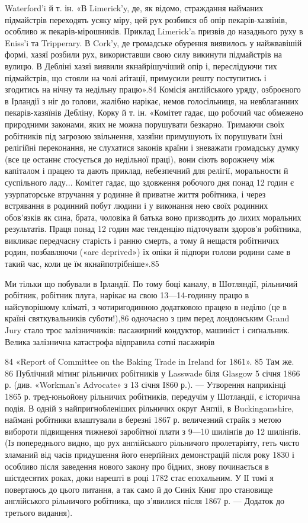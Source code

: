 Waterford’i й т. ін. «В Limerick’y, де, як відомо, страждання
найманих підмайстрів переходять усяку міру, цей рух розбився
об опір пекарів-хазяїнів, особливо ж пекарів-мірошників. Приклад
Limerick’a призвів до назаднього руху в Eniss’i та Tripperary.
В Cork’y, де громадське обурення виявилось у найжвавішій
формі, хазяї розбили рух, використавши свою силу викинути підмайстрів
на вулицю. В Дебліні хазяї виявили якнайрішучіший
опір і, переслідуючи тих підмайстрів, що стояли на чолі аґітації,
примусили решту поступитись і згодитись на нічну та недільну
працю».84 Комісія англійського уряду, озброєного в Ірландії
з ніг до голови, жалібно нарікає, немов голосільниця, на невблаганних
пекарів-хазяїнів Дебліну, Корку й т. ін. «Комітет гадає,
що робочий час обмежено природними законами, яких не можна
порушувати безкарно. Тримаючи своїх робітників під загрозою
звільнення, хазяїни примушують їх порушувати їхні релігійні
переконання, не слухатися законів країни і зневажати громадську
думку (все це останнє стосується до недільної праці), вони сіють
ворожнечу між капіталом і працею та дають приклад, небезпечний
для релігії, моральности й суспільного ладу... Комітет гадає,
що здовження робочого дня понад 12 годин є узурпаторське втручання
у родинне й приватне життя робітника, і через встрявання
в родинний побут людини і у виконання нею своїх родинних обов’язків
як сина, брата, чоловіка й батька воно призводить до лихих
моральних результатів. Праця понад 12 годин має тенденцію підточувати
здоров’я робітника, викликає передчасну старість і
ранню смерть, а тому й нещастя робітничих родин, позбавляючи
(«are deprived») їх опіки й підпори голови родини саме в такий
час, коли це їм якнайпотрібніше».85

Ми тільки що побували в Ірландії. По тому боці каналу, в
Шотляндії, рільничий робітник, робітник плуга, нарікає на свою
13—14-годинну працю в найсуворішому кліматі, з чотиригодинною
додатковою працею в неділю (це в країні святкувальників
суботи!),86 одночасно з цим перед лондонським Grand Jury стало
троє залізничників: пасажирний кондуктор, машиніст і сиґнальник.
Велика залізнична катастрофа відправила сотні пасажирів

84 «Report of Committee on the Baking Trade in Ireland for 1861».
85 Там же.
86 Публічний мітинґ рільничих робітників у Lasswade біля Glasgow
5 січня 1866 р. (див. «Workman’s Advocate» з 13 січня I860 р.). — Утворення
наприкінці 1865 р. тред-юньойону рільничих робітників, передучім
у Шотландії, є історична подія. В одній з найпригнобленіших рільничих
округ Англії, в Buckingamshire, наймані робітники влаштували
в березні 1867 р. величезний страйк з метою вибороти підвищення тижневої
заробітної плати з 9—10 шилінґів до 12 шилінґів. (Із попереднього
видно, що рух англійського рільничого пролетаріяту, геть чисто зламаний
від часів придушення його енерґійних демонстрацій після року 1830
і особливо після заведення нового закону про бідних, знову починається
в шістдесятих роках, доки нарешті в році 1782 стає епохальним. У ІІ томі
я повертаюсь до цього питання, а так само й до Синіх Книг про становище
англійського рільничого робітника, що з’явилися після 1867 р. — Додаток
до третього видання).
